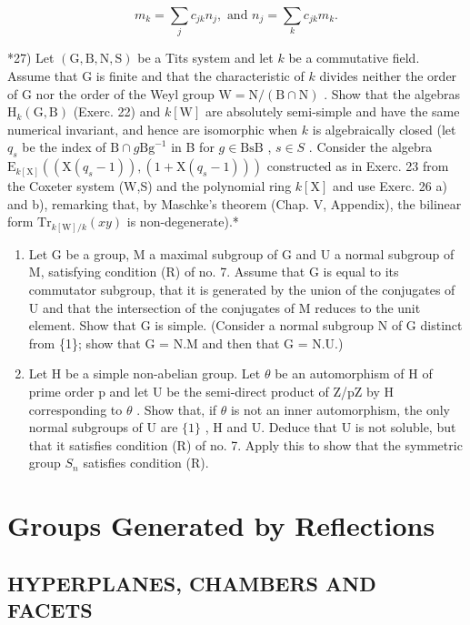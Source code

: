 \[
m _ {k} = \sum_ {j} c _ {j k} n _ {j}, \text { and } n _ {j} = \sum_ {k} c _ {j k} m _ {k}.
\]

*27) Let \((\mathrm{G},\mathrm{B},\mathrm{N},\mathrm{S})\) be a Tits system and let \(k\) be a commutative field. Assume that G is finite and that the characteristic of \(k\) divides neither the order of G nor the order of the Weyl group \(\mathrm{W} = \mathrm{N} / (\mathrm{B}\cap \mathrm{N})\) . Show that the algebras \(\mathrm{H}_k(\mathrm{G},\mathrm{B})\) (Exerc. 22) and \(k[\mathrm{W}]\) are absolutely semi-simple and have the same numerical invariant, and hence are isomorphic when \(k\) is algebraically closed (let \(q_{s}\) be the index of \(\mathrm{B}\cap g\mathrm{Bg}^{-1}\) in B for \(g\in \mathrm{BsB}\) , \(s\in S\) . Consider the algebra \(\mathrm{E}_{k[\mathrm{X}]}((\mathrm{X}(q_s - 1)),(1 + \mathrm{X}(q_s - 1)))\) constructed as in Exerc. 23 from the Coxeter system (W,S) and the polynomial ring \(k[\mathrm{X}]\) and use Exerc. 26 a) and b), remarking that, by Maschke's theorem (Chap. V, Appendix), the bilinear form \(\mathrm{Tr}_{k[\mathrm{W}] / k}(xy)\) is non-degenerate).*

\begin{enumerate}
\def\labelenumi{\arabic{enumi})}
\setcounter{enumi}{27}
\item
  Let G be a group, M a maximal subgroup of G and U a normal subgroup of M, satisfying condition (R) of no. 7. Assume that G is equal to its commutator subgroup, that it is generated by the union of the conjugates of U and that the intersection of the conjugates of M reduces to the unit element. Show that G is simple. (Consider a normal subgroup N of G distinct from \{1\}; show that G = N.M and then that G = N.U.)
\item
  Let H be a simple non-abelian group. Let \(\theta\) be an automorphism of H of prime order p and let U be the semi-direct product of Z/pZ by H corresponding to \(\theta\) . Show that, if \(\theta\) is not an inner automorphism, the only normal subgroups of U are \(\{1\}\) , H and U. Deduce that U is not soluble, but that it satisfies condition (R) of no. 7. Apply this to show that the symmetric group \(S_{n}\) satisfies condition (R).
\end{enumerate}

\chapter{Groups Generated by Reflections}

\section{HYPERPLANES, CHAMBERS AND FACETS}

